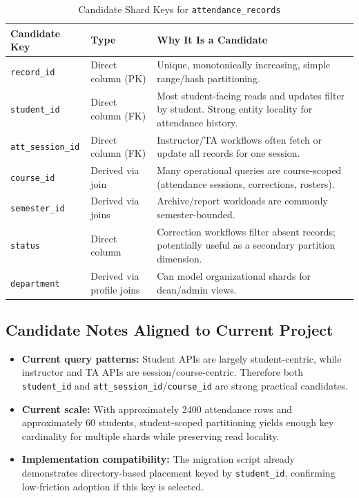 \documentclass[conference]{IEEEtran}
\begin{document}
\begin{table}[htbp]
\caption{Candidate Shard Keys for \texttt{attendance\_records}}
\centering
\begin{tabular}{p{2.4cm}p{1.9cm}p{3.1cm}}
\toprule
\textbf{Candidate Key} & \textbf{Type} & \textbf{Why It Is a Candidate} \\
\midrule
\texttt{record\_id} & Direct column (PK) & Unique, monotonically increasing, simple range/hash partitioning. \\
\texttt{student\_id} & Direct column (FK) & Most student-facing reads and updates filter by student. Strong entity locality for attendance history. \\
\texttt{att\_session\_id} & Direct column (FK) & Instructor/TA workflows often fetch or update all records for one session. \\
\texttt{course\_id} & Derived via join & Many operational queries are course-scoped (attendance sessions, corrections, rosters). \\
\texttt{semester\_id} & Derived via joins & Archive/report workloads are commonly semester-bounded. \\
\texttt{status} & Direct column & Correction workflows filter absent records; potentially useful as a secondary partition dimension. \\
\texttt{department} & Derived via profile joins & Can model organizational shards for dean/admin views. \\
\bottomrule
\end{tabular}
\label{tab:candidate_keys}
\end{table}

\subsection{Candidate Notes Aligned to Current Project}
\begin{itemize}
    \item \textbf{Current query patterns:} Student APIs are largely student-centric, while instructor and TA APIs are session/course-centric. Therefore both \texttt{student\_id} and \texttt{att\_session\_id}/\texttt{course\_id} are strong practical candidates.
    \item \textbf{Current scale:} With approximately 2400 attendance rows and approximately 60 students, student-scoped partitioning yields enough key cardinality for multiple shards while preserving read locality.
    \item \textbf{Implementation compatibility:} The migration script already demonstrates directory-based placement keyed by \texttt{student\_id}, confirming low-friction adoption if this key is selected.
\end{itemize}
\end{document}
